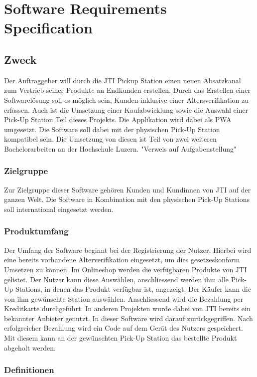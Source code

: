\section{Software Requirements Specification}\label{RSR}


\subsection{Zweck}
Der Auftraggeber will durch die JTI Pickup Station einen neuen Absatzkanal zum Vertrieb seiner Produkte an Endkunden erstellen. Durch das Erstellen einer Softwarelösung soll es möglich sein, Kunden inklusive einer Altersverifikation zu erfassen. Auch ist die Umsetzung einer Kaufabwicklung sowie die Auswahl einer Pick-Up Station Teil dieses Projekts. Die Applikation wird dabei als \ac{PWA} umgesetzt. Die Software soll dabei mit der physischen Pick-Up Station kompatibel sein. Die Umsetzung von diesen ist Teil von zwei weiteren Bachelorarbeiten an der Hochschule Luzern.  
"Verweis auf Aufgabenstellung"
\subsubsection{Zielgruppe}
Zur Zielgruppe dieser Software gehören Kunden und Kundinnen von \ac{JTI} auf der ganzen Welt. Die Software in Kombination mit den physischen Pick-Up Stations soll international eingesetzt werden. 
\subsubsection{Produktumfang}
Der Umfang der Software beginnt bei der Registrierung der Nutzer. Hierbei wird eine bereits vorhandene Alterverifikation eingesetzt, um dies gesetzeskonform Umsetzen zu können. Im Onlineshop werden die verfügbaren Produkte von \ac{JTI} gelistet. Der Nutzer kann diese Auswählen, anschliessend werden ihm alle Pick-Up Stations, in denen das Produkt verfügbar ist, angezeigt. Der Käufer kann die von ihm gewünschte Station auswählen. Anschliessend wird die Bezahlung per Kreditkarte durchgeführt. In anderen Projekten wurde dabei von \ac{JTI} bereits ein bekannter Anbieter genutzt. In dieser Software wird darauf zurückgegriffen. Nach erfolgreicher Bezahlung wird ein Code auf dem Gerät des Nutzers gespeichert. Mit diesem kann an der gewünschten Pick-Up Station das bestellte Produkt abgeholt werden. 

\subsubsection{Definitionen}
